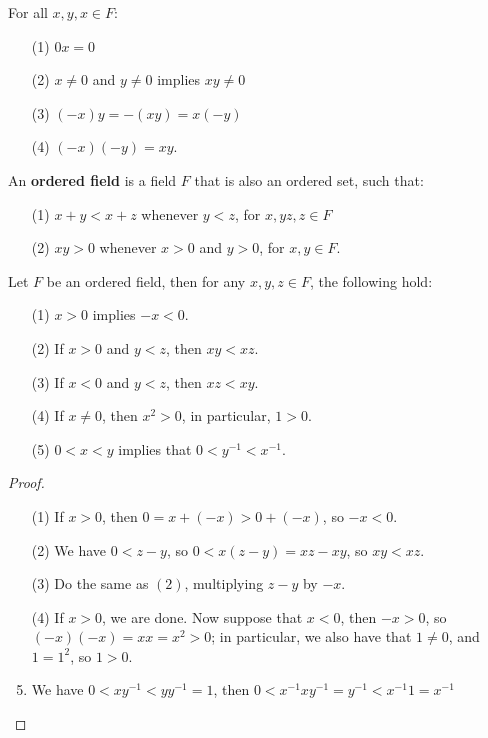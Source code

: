 \begin{proposition}\label{proposition_1.2.3}
  For all $x,y,x \in F$:
  \begin{enumerate}
    \item[(1)] $0x=0$

    \item[(2)] $x \neq 0$ and $y \neq 0$ implies $xy \neq 0$

    \item[(3)] $(-x)y=-(xy)=x(-y)$

    \item[(4)] $(-x)(-y)=xy$.
  \end{enumerate}
\end{proposition}

\begin{definition}
  An \textbf{ordered field} is a field $F$ that is also an ordered set, such that:
  \begin{enumerate}
    \item[(1)] $x+y<x+z$ whenever $y<z$, for  $x,yz,z \in F$

    \item[(2)] $xy>0$ whenever  $x>0$ and  $y>0$, for  $x,y \in F$.
  \end{enumerate}
\end{definition}


\begin{proposition}\label{proposition_1.2.4}
  Let $F$ be an ordered field, then for any  $x,y,z \in F$, the following hold:
  \begin{enumerate}
    \item[(1)] $x>0$ implies $-x<0$.

    \item[(2)] If $x>0$  and $y<z$, then $xy<xz$.

    \item[(3)] If $x<0$  and $y<z$, then $xz<xy$.

    \item[(4)] If $x \neq 0$, then $x^2>0$, in particular, $1>0$.

    \item[(5)] $0<x<y$ implies that $0<y^{-1}<x^{-1}$.
  \end{enumerate}
\end{proposition}
\begin{proof}
  \begin{enumerate}
    \item[(1)] If $x>0$, then  $0=x+(-x)>0+(-x)$, so  $-x<0$.

    \item[(2)] We have $0<z-y$, so  $0<x(z-y)=xz-xy$, so $xy<xz$.

    \item[(3)] Do the same as  $(2)$, multiplying  $z-y$ by  $-x$.

    \item[(4)] If  $x>0$, we are done. Now suppose that  $x<0$, then  $-x>0$, so
      $(-x)(-x)=xx=x^2>0$; in particular, we also have that  $1 \neq 0$, and
      $1=1^2$, so  $1>0$.

    \item We have  $0<xy^{-1}<yy^{-1}=1$, then
      $0<x^{-1}xy^{-1}=y^{-1}<x^{-1}1=x^{-1}$
  \end{enumerate}
\end{proof}
